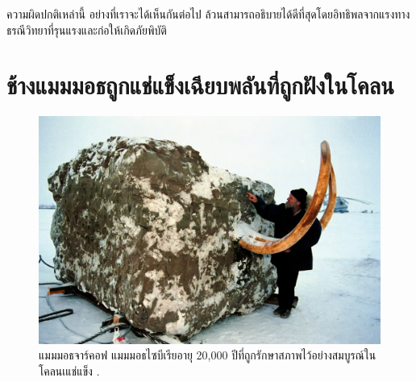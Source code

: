 \documentclass[10pt,twocolumn,letterpaper]{article}
\begin{document}
ความผิดปกติเหล่านี้ อย่างที่เราจะได้เห็นกันต่อไป ล้วนสามารถอธิบายได้ดีที่สุดโดยอิทธิพลจากแรงทางธรณีวิทยาที่รุนแรงและก่อให้เกิดภัยพิบัติ

\section{ช้างแมมมอธถูกแช่แข็งเฉียบพลันที่ถูกฝังในโคลน}
\begin{figure}[t]
\begin{center}
   \includegraphics[width=1\linewidth]{jarkov-mammoth.jpg}
\end{center}
   \caption{แมมมอธจาร์คอฟ แมมมอธไซบีเรียอายุ 20,000 ปีที่ถูกรักษาสภาพไว้อย่างสมบูรณ์ในโคลนเแช่แข็ง \cite{51}.}
\label{fig:1}
\label{fig:onecol}
\end{figure}
\end{document}
